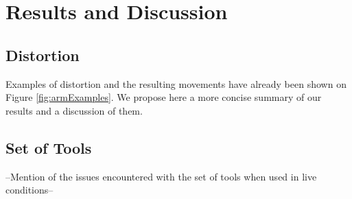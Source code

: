 
\chapter{Results and Discussion}

\label{Chapter5}

\section{Distortion}

Examples of distortion and the resulting movements have already been shown on Figure \ref{fig:armExamples}. We propose here a more concise summary of our results and a discussion of them.

\section{Set of Tools}

--Mention of the issues encountered with the set of tools when used in live conditions--